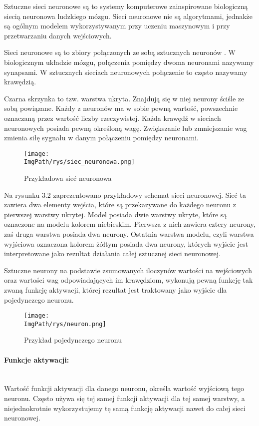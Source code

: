 \documentclass[a4paper,12pt,twoside,openany]{report}
\newcommand{\ImgPath}{.}
\begin{document}
Sztuczne sieci neuronowe są to systemy komputerowe zainspirowane biologiczną siecią neuronowa ludzkiego mózgu. Sieci neuronowe nie są algorytmami, jednakże są ogólnym modelem wykorzystywanym przy uczeniu maszynowym i przy przetwarzaniu danych wejściowych.

Sieci neuronowe są to zbiory połączonych ze sobą sztucznych neuronów \cite{Osowski}. W biologicznym układzie mózgu, połączenia pomiędzy dwoma neuronami nazywamy synapsami. W sztucznych sieciach neuronowych połączenie to często nazywamy krawędzią. 

Czarna skrzynka to tzw. warstwa ukryta. Znajdują się w niej neurony ściśle ze sobą powiązane. Każdy z neuronów ma w sobie pewną wartość, powszechnie oznaczaną przez wartość liczby rzeczywistej. Każda krawędź w sieciach neuronowych posiada pewną określoną wagę. Zwiększanie lub zmniejszanie wag zmienia siłę sygnału w danym połączeniu pomiędzy neuronami.

\begin{figure}[H]	
	\centering
	\texttt{[image: \\ImgPath/rys/siec\_neuronowa.png]}
	
	\caption{Przykładowa sieć neuronowa}
\end{figure}

Na rysunku 3.2 zaprezentowano przykładowy schemat sieci neuronowej. Sieć ta zawiera dwa elementy wejścia, które są przekazywane do każdego neuronu z pierwszej warstwy ukrytej. Model posiada dwie warstwy ukryte, które są oznaczone na modelu kolorem niebieskim. Pierwsza z nich zawiera cztery neurony, zaś druga warstwa posiada dwa neurony. Ostatnia warstwa modelu, czyli warstwa wyjściowa oznaczona kolorem żółtym posiada dwa neurony, których wyjście jest interpretowane jako rezultat działania całej sztucznej sieci neuronowej.

Sztuczne neurony na podstawie zsumowanych iloczynów wartości na wejściowych oraz wartości wag odpowiadających im krawędziom, wykonują pewną funkcję tak zwaną funkcję aktywacji, której rezultat jest traktowany jako wyjście dla pojedynczego neuronu. 

\begin{figure}[H]	
	\centering
	\texttt{[image: \\ImgPath/rys/neuron.png]}
	
	\caption{Przykład pojedynczego neuronu}
\end{figure}

\paragraph{Funkcje aktywacji:}
\mbox{} \\ \indent
Wartość funkcji aktywacji dla danego neuronu, określa wartość wyjściową tego neuronu. Często używa się tej samej funkcji aktywacji dla tej samej warstwy, a niejednokrotnie wykorzystujemy tę samą funkcję aktywacji nawet do całej sieci neuronowej. 
\end{document}
